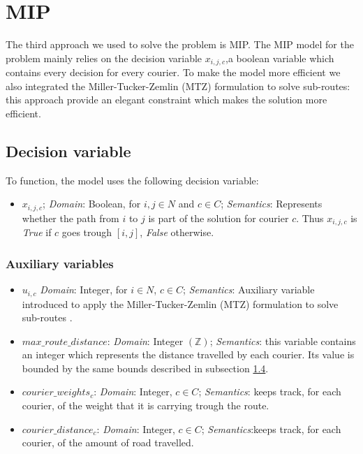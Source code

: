 \section{MIP}

The third approach we used to solve the problem is MIP. The MIP model for the problem mainly relies on the decision variable $x_{i,j,c}$,a boolean variable which contains every decision for every courier. To make the model more efficient we also integrated the Miller-Tucker-Zemlin (MTZ) formulation to solve sub-routes: this approach provide an elegant constraint which makes the solution more efficient. 

\subsection{Decision variable}

To function, the model uses the following decision variable:

\begin{itemize}
     \item $x_{i,j,c}$; \textit{Domain}: Boolean, for $i,j \in N$ and $c \in C$; \textit{Semantics}: Represents whether the path from $i$ to $j$ is part of the solution for courier $c$. Thus $x_{i,j,c}$ is \textit{True} if $c$ goes trough $[i,j]$, \textit{False} otherwise.
     
\end{itemize}

\subsubsection{Auxiliary variables}

\begin{itemize}
    \item $u_{i,c}$ \textit{Domain}: Integer, for $i \in N$, $c \in C$; \textit{Semantics}: Auxiliary variable introduced to apply the Miller-Tucker-Zemlin (MTZ) formulation to solve sub-routes \cite{mtz}. 

    \item $max\_route\_distance$: \textit{Domain}: Integer $(\mathbb{Z})$; \textit{Semantics}: this variable contains an integer which represents the distance travelled by each courier. Its value is bounded by the same bounds described in subsection \hyperlink{1.4}{1.4}.

    \item $courier\_weights_c$: \textit{Domain}: Integer, $c \in C$; \textit{Semantics}: keeps track, for each courier, of the weight that it is carrying trough the route.


     \item $courier\_distance_c$: \textit{Domain}: Integer, $c \in C$; \textit{Semantics}:keeps track, for each courier, of the amount of road travelled. 
    
    
\end{itemize}

